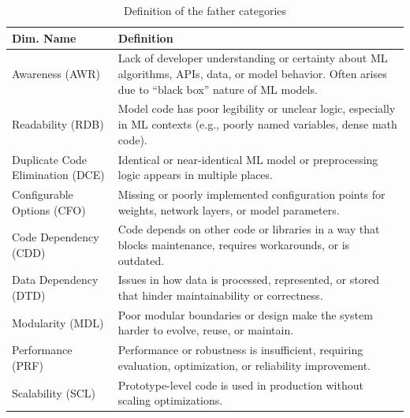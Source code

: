 \begin{table}[ht]
\centering
\small
\caption{Definition of the father categories}
\label{tab:Super_def}
\setlength{\tabcolsep}{6pt}
\renewcommand{\arraystretch}{1.15}
\begin{tabularx}{\textwidth}{
    >{\raggedright\arraybackslash}p{3.4cm}
    >{\raggedright\arraybackslash}X
}
\hline
\textbf{Dim. Name} & \textbf{Definition} \\
\hline
Awareness (AWR) & Lack of developer understanding or certainty about ML algorithms, APIs, data, or model behavior. Often arises due to ``black box'' nature of ML models. \\
\hline
Readability (RDB) & Model code has poor legibility or unclear logic, especially in ML contexts (e.g., poorly named variables, dense math code). \\
\hline
Duplicate Code Elimination (DCE) & Identical or near-identical ML model or preprocessing logic appears in multiple places. \\
\hline
Configurable Options (CFO) & Missing or poorly implemented configuration points for weights, network layers, or model parameters. \\
\hline
Code Dependency (CDD) & Code depends on other code or libraries in a way that blocks maintenance, requires workarounds, or is outdated. \\
\hline
Data Dependency (DTD) & Issues in how data is processed, represented, or stored that hinder maintainability or correctness. \\
\hline
Modularity (MDL) & Poor modular boundaries or design make the system harder to evolve, reuse, or maintain. \\
\hline
Performance (PRF) & Performance or robustness is insufficient, requiring evaluation, optimization, or reliability improvement. \\
\hline
Scalability (SCL) & Prototype-level code is used in production without scaling optimizations. \\
\hline
\end{tabularx}
\end{table}